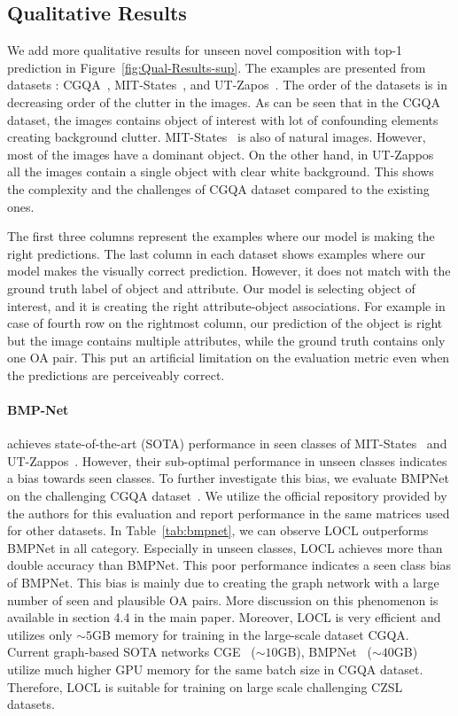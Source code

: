 \documentclass{bmvc2k}
\begin{document}
\subsection{Qualitative Results}
We add more qualitative results for unseen novel composition with top-1 prediction in Figure~\ref{fig:Qual-Results-sup}. The examples are presented from datasets : CGQA~\cite{naeem2021learning}, MIT-States~\cite{isola2015discovering}, and UT-Zapos~\cite{yu2017semantic}. The order of the datasets is in decreasing order of the clutter in the images. As can be seen that in the CGQA dataset, the images contains object of interest with lot of confounding elements creating background clutter. MIT-States~\cite{isola2015discovering} is also of natural images. However, most of the images have a dominant object. On the other hand, in UT-Zappos~\cite{yu2017semantic} all the images contain a single object with clear white background. This shows the complexity and the challenges of CGQA dataset compared to the existing ones. 

The first three columns represent the examples where our model is making the right predictions. The last column in each dataset shows examples where our model makes the visually correct prediction. However, it does not match with the ground truth label of object and attribute. Our model is selecting object of interest, and it is creating the right attribute-object associations. For example in case of fourth row on the rightmost column, our prediction of the object is right but the image contains multiple attributes, while the ground truth contains only one OA pair. This put an artificial limitation on the evaluation metric even when the predictions are perceiveably correct. 

\paragraph{BMP-Net~\cite{xu2021relation}}achieves state-of-the-art (SOTA) performance in seen classes of MIT-States~\cite{misra2017red} and UT-Zappos~\cite{yu2017semantic}. However, their sub-optimal performance in unseen classes indicates a bias towards seen classes. To further investigate this bias, we evaluate BMPNet on the challenging CGQA dataset~\cite{naeem2021learning}. We utilize the official repository provided by the authors for this evaluation and report performance in the same matrices used for other datasets. In Table~\ref{tab:bmpnet}, we can observe LOCL outperforms BMPNet in all category. Especially in unseen classes, LOCL achieves more than double accuracy than BMPNet. This poor performance indicates a seen class bias of BMPNet. This bias is mainly due to creating the graph network with a large number of seen and plausible OA pairs. More discussion on this phenomenon is available in section 4.4 in the main paper. Moreover, LOCL is very efficient and utilizes only $\sim5$GB memory for training in the large-scale dataset CGQA. Current graph-based SOTA networks CGE~\cite{naeem2021learning} ($\sim10$GB), BMPNet~\cite{xu2021relation} ($\sim40$GB) utilize much higher GPU memory for the same batch size in CGQA dataset. Therefore, LOCL is suitable for training on large scale challenging CZSL datasets.
\end{document}
